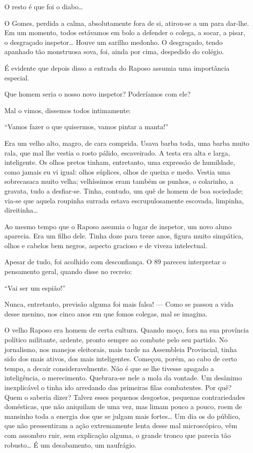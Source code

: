O resto é que foi o diabo\ldots{}

O Gomes, perdida a calma, absolutamente fora de si, atirou-se a um para
dar-lhe. Em um momento, todos estávamos em bolo a defender o colega, a
socar, a pisar, o desgraçado inspetor\ldots{} Houve um sarilho medonho. O
desgraçado, tendo apanhado tão monstruosa sova, foi, ainda por cima,
despedido do colégio.

É evidente que depois disso a entrada do Raposo assumia uma importância
especial.

Que homem seria o nosso novo inspetor? Poderíamos com ele?

Mal o vimos, dissemos todos intimamente:

``Vamos fazer o que quisermos, vamos pintar a manta!''

Era um velho alto, magro, de cara comprida. Usava barba toda, uma barba
muito rala, que mal lhe vestia o rosto pálido, escaveirado. A testa era
alta e larga, inteligente. Os olhos pretos tinham, entretanto, uma
expressão de humildade, como jamais eu vi igual: olhos súplices, olhos
de queixa e medo. Vestia uma sobrecasaca muito velha; velhíssimos eram
também os punhos, o colarinho, a gravata, tudo a desfiar-se. Tinha,
contudo, um quê de homem de boa sociedade; via-se que aquela roupinha
surrada estava escrupulosamente escovada, limpinha, direitinha\ldots{}

Ao mesmo tempo que o Raposo assumia o lugar de inspetor, um novo aluno
aparecia. Era um filho dele. Tinha doze para treze anos, figura muito
simpática, olhos e cabelos bem negros, aspecto gracioso e de viveza
intelectual.

Apesar de tudo, foi acolhido com desconfiança. O 89 pareceu interpretar
o pensamento geral, quando disse no recreio:

``Vai ser um espião!''

Nunca, entretanto, previsão alguma foi mais falsa! --- Como se passou a
vida desse menino, nos cinco anos em que fomos colegas, mal se imagina.

O velho Raposo era homem de certa cultura. Quando moço, fora na sua
província político militante, ardente, pronto sempre ao combate pelo seu
partido. No jornalismo, nos manejos eleitorais, mais tarde na Assembleia
Provincial, tinha sido dos mais ativos, dos mais inteligentes. Começou,
porém, ao cabo de certo tempo, a decair consideravelmente. Não é que se
lhe tivesse apagado a inteligência, o merecimento. Quebrara-se nele a
mola da vontade. Um desânimo inexplicável o tinha ido arredando das
primeiras filas combatentes. Por quê? Quem o saberia dizer? Talvez esses
pequenos desgostos, pequenas contrariedades domésticas, que não
aniquilam de uma vez, mas limam pouco a pouco, roem de mansinho toda a
energia dos que se julgam mais fortes\ldots{} Um dia os do público, que não
pressentiram a ação extremamente lenta desse mal microscópico, vêm com
assombro ruir, sem explicação alguma, o grande tronco que parecia tão
robusto\ldots{} É um desabamento, um naufrágio.

